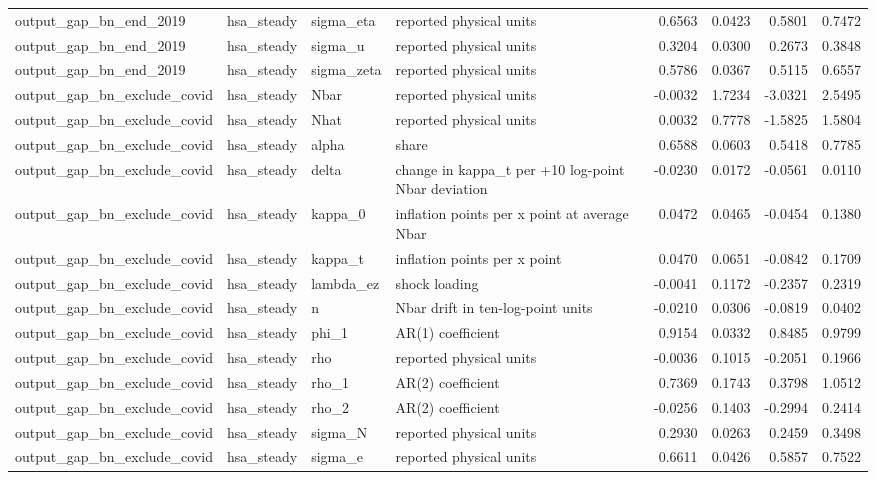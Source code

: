 \begin{tabular}{llllrrrr}
output\_gap\_bn\_end\_2019 & hsa\_steady & sigma\_eta & reported physical units & 0.6563 & 0.0423 & 0.5801 & 0.7472 \\
output\_gap\_bn\_end\_2019 & hsa\_steady & sigma\_u & reported physical units & 0.3204 & 0.0300 & 0.2673 & 0.3848 \\
output\_gap\_bn\_end\_2019 & hsa\_steady & sigma\_zeta & reported physical units & 0.5786 & 0.0367 & 0.5115 & 0.6557 \\
output\_gap\_bn\_exclude\_covid & hsa\_steady & Nbar & reported physical units & -0.0032 & 1.7234 & -3.0321 & 2.5495 \\
output\_gap\_bn\_exclude\_covid & hsa\_steady & Nhat & reported physical units & 0.0032 & 0.7778 & -1.5825 & 1.5804 \\
output\_gap\_bn\_exclude\_covid & hsa\_steady & alpha & share & 0.6588 & 0.0603 & 0.5418 & 0.7785 \\
output\_gap\_bn\_exclude\_covid & hsa\_steady & delta & change in kappa\_t per +10 log-point Nbar deviation & -0.0230 & 0.0172 & -0.0561 & 0.0110 \\
output\_gap\_bn\_exclude\_covid & hsa\_steady & kappa\_0 & inflation points per x point at average Nbar & 0.0472 & 0.0465 & -0.0454 & 0.1380 \\
output\_gap\_bn\_exclude\_covid & hsa\_steady & kappa\_t & inflation points per x point & 0.0470 & 0.0651 & -0.0842 & 0.1709 \\
output\_gap\_bn\_exclude\_covid & hsa\_steady & lambda\_ez & shock loading & -0.0041 & 0.1172 & -0.2357 & 0.2319 \\
output\_gap\_bn\_exclude\_covid & hsa\_steady & n & Nbar drift in ten-log-point units & -0.0210 & 0.0306 & -0.0819 & 0.0402 \\
output\_gap\_bn\_exclude\_covid & hsa\_steady & phi\_1 & AR(1) coefficient & 0.9154 & 0.0332 & 0.8485 & 0.9799 \\
output\_gap\_bn\_exclude\_covid & hsa\_steady & rho & reported physical units & -0.0036 & 0.1015 & -0.2051 & 0.1966 \\
output\_gap\_bn\_exclude\_covid & hsa\_steady & rho\_1 & AR(2) coefficient & 0.7369 & 0.1743 & 0.3798 & 1.0512 \\
output\_gap\_bn\_exclude\_covid & hsa\_steady & rho\_2 & AR(2) coefficient & -0.0256 & 0.1403 & -0.2994 & 0.2414 \\
output\_gap\_bn\_exclude\_covid & hsa\_steady & sigma\_N & reported physical units & 0.2930 & 0.0263 & 0.2459 & 0.3498 \\
output\_gap\_bn\_exclude\_covid & hsa\_steady & sigma\_e & reported physical units & 0.6611 & 0.0426 & 0.5857 & 0.7522 \\

\end{tabular}
